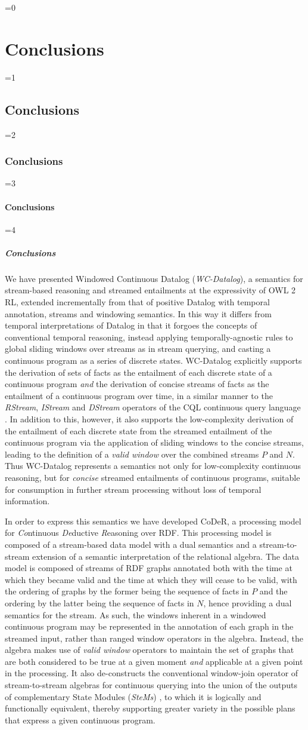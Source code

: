 \documentclass[twocolumn,preprint,3p,number]{elsarticle}
\theoremstyle{plain}
\theoremstyle{definition}
\newcounter{nestingdepth}
\newenvironment{nestedsection}[2]{
  \ifnum\value{nestingdepth}=0
    \chapter{#1}
  \else
    \ifnum\value{nestingdepth}=1
      \section{#1}
    \else
      \ifnum\value{nestingdepth}=2
        \subsection{#1}
      \else
        \ifnum\value{nestingdepth}=3
          \subsubsection{#1}
        \else
          \ifnum\value{nestingdepth}=4
            \paragraph{#1}
          \else
            \PackageError{nestedsections}{Maximum nesting level exceeded!}{uh oh!}
          \fi
        \fi
      \fi
    \fi
  \fi
  \addtocounter{nestingdepth}{1}
  \label{sec:#2}
}{\addtocounter{nestingdepth}{-1}}
\begin{document}
\begin{nestedsection}{Conclusions}{conclusions}
  We have presented Windowed Continuous Datalog (\emph{WC-Datalog}), a semantics for stream-based reasoning and streamed entailments at the expressivity of OWL 2 RL, extended incrementally from that of positive Datalog with temporal annotation, streams and windowing semantics.
  In this way it differs from temporal interpretations of Datalog \citep{OrgunWadge92,Tuzhilin93} in that it forgoes the concepts of conventional temporal reasoning, instead applying temporally-agnostic rules to global sliding windows over streams as in stream querying, and casting a continuous program as a series of discrete states.
  WC-Datalog explicitly supports the derivation of sets of facts as the entailment of each discrete state of a continuous program \emph{and} the derivation of concise streams of facts as the entailment of a continuous program over time, in a similar manner to the \emph{RStream}, \emph{IStream} and \emph{DStream} operators of the CQL continuous query language \citep{CQL}.
  In addition to this, however, it also supports the low-complexity derivation of the entailment of each discrete state from the streamed entailment of the continuous program via the application of sliding windows to the concise streams, leading to the definition of a \emph{valid window} over the combined streams $P$ and $N$.
  Thus WC-Datalog represents a semantics not only for low-complexity continuous reasoning, but for \emph{concise} streamed entailments of continuous programs, suitable for consumption in further stream processing without loss of temporal information.

  In order to express this semantics we have developed CoDeR, a processing model for \emph{Co}ntinuous \emph{De}ductive \emph{R}easoning over RDF.
  This processing model is composed of a stream-based data model with a dual semantics and a stream-to-stream extension of a semantic interpretation of the relational algebra.
  The data model is composed of streams of RDF graphs annotated both with the time at which they became valid and the time at which they will cease to be valid, with the ordering of graphs by the former being the sequence of facts in $P$ and the ordering by the latter being the sequence of facts in $N$, hence providing a dual semantics for the stream.
  As such, the windows inherent in a windowed continuous program may be represented in the annotation of each graph in the streamed input, rather than ranged window operators in the algebra.
  Instead, the algebra makes use of \emph{valid window} operators to maintain the set of graphs that are both considered to be true at a given moment \emph{and} applicable at a given point in the processing.
  It also de-constructs the conventional window-join operator of stream-to-stream algebras for continuous querying into the union of the outputs of complementary State Modules (\emph{SteMs}) \citep{SteMs}, to which it is logically and functionally equivalent, thereby supporting greater variety in the possible plans that express a given continuous program.


\end{nestedsection}
\end{document}
